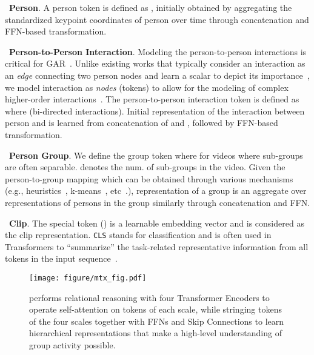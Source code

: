 \documentclass[runningheads]{llncs}
\begin{document}
 




\noindent \textbullet\
\textbf{Person}. 
A person token is defined as  , initially obtained by aggregating the
standardized 
keypoint coordinates of person  over time
through concatenation and FFN-based transformation.


\noindent \textbullet\ \textbf{Person-to-Person Interaction}. 
Modeling the person-to-person interactions is critical for GAR~\cite{wu2021comprehensive}. Unlike existing works that typically consider an interaction as an \textit{edge} connecting two person nodes and learn a scalar to depict its importance~\cite{sam}, we model interaction as \textit{nodes} (tokens) to allow for the modeling of complex higher-order interactions~\cite{luo2021moma}.
The person-to-person interaction token is defined as  where  (bi-directed interactions). Initial representation of the interaction between person  and  is learned from
concatenation of
 and , followed by FFN-based transformation.



\noindent \textbullet\ \textbf{Person Group}. 
We define the group token  where  for videos where sub-groups are often separable.
 denotes the num. of sub-groups in the video.
Given the person-to-group mapping which can be obtained through various mechanisms (e.g., heuristics~\cite{GIRN}, k-means~\cite{GroupFormer}, etc~\cite{ehsanpour2020joint,koshkina2021contrastive}.), representation of a group is an aggregate over representations of persons in the group similarly through concatenation and FFN.


\noindent \textbullet\ \textbf{Clip}. The special  token () is a learnable embedding vector and is considered as the clip representation. 
\texttt{CLS} stands for classification and is often used in Transformers to ``summarize'' the task-related representative information from all tokens in the input sequence~\cite{devlin2018bert}.

 
 
\begin{figure}[t]
\centering
	\texttt{[image: figure/mtx\_fig.pdf]}
    \caption{\textbf{\mtx}performs relational reasoning with four
	Transformer Encoders to operate self-attention on tokens of each scale, while stringing tokens of the four
	scales together
	with FFNs and Skip Connections
	to learn hierarchical representations that make a high-level understanding
	of group activity
	possible. 
}
\label{fig:mtx}
\end{figure} 
\end{document}
